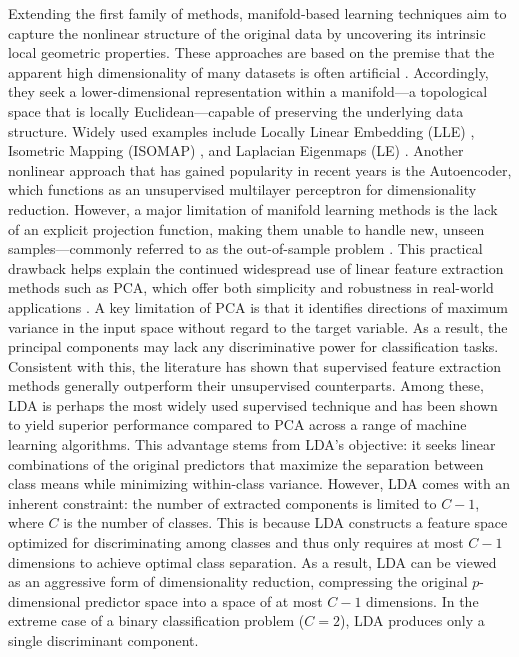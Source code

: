 \documentclass[11pt,a4paper]{article}
\begin{document}
Extending the first family of methods, manifold-based learning techniques aim to capture the nonlinear structure of the original data by uncovering its intrinsic local geometric properties. These approaches are based on the premise that the apparent high dimensionality of many datasets is often artificial \citep{zhou2011manifold}. Accordingly, they seek a lower-dimensional representation within a manifold---a topological space that is locally Euclidean---capable of preserving the underlying data structure.
Widely used examples include Locally Linear Embedding (LLE) \citep{roweis2000nonlinear}, Isometric Mapping (ISOMAP) \citep{tenenbaum2000global}, and Laplacian Eigenmaps (LE) \citep{belkin2003laplacian}. Another nonlinear approach that has gained popularity in recent years is the Autoencoder, which functions as an unsupervised multilayer perceptron for dimensionality reduction.
However, a major limitation of manifold learning methods is the lack of an explicit projection function, making them unable to handle new, unseen samples---commonly referred to as the out-of-sample problem \citep{bengio2003out}. This practical drawback helps explain the continued widespread use of linear feature extraction methods such as PCA, which offer both simplicity and robustness in real-world applications \citep{zebari2020comprehensive, sadegh2024comparative}.
A key limitation of PCA is that it identifies directions of maximum variance in the input space without regard to the target variable. As a result, the principal components may lack any discriminative power for classification tasks. Consistent with this, the literature has shown that supervised feature extraction methods generally outperform their unsupervised counterparts.
Among these, LDA is perhaps the most widely used supervised technique and has been shown to yield superior performance compared to PCA across a range of machine learning algorithms. This advantage stems from LDA's objective: it seeks linear combinations of the original predictors that maximize the separation between class means while minimizing within-class variance.
However, LDA comes with an inherent constraint: the number of extracted components is limited to $C - 1$, where $C$ is the number of classes. This is because LDA constructs a feature space optimized for discriminating among classes and thus only requires at most $C - 1$ dimensions to achieve optimal class separation. As a result, LDA can be viewed as an aggressive form of dimensionality reduction, compressing the original $p$-dimensional predictor space into a space of at most $C - 1$ dimensions. In the extreme case of a binary classification problem ($C = 2$), LDA produces only a single discriminant component.
\end{document}
